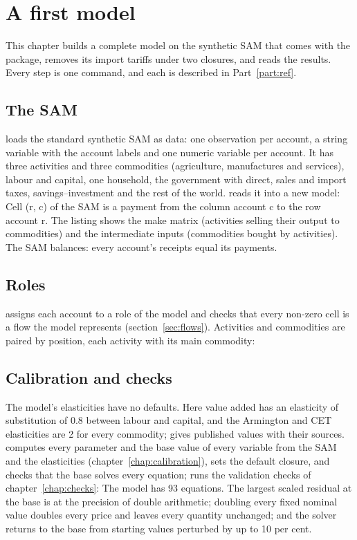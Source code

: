 \chapter{A first model}\label{chap:start}

This chapter builds a complete model on the synthetic SAM that comes with the
package, removes its import tariffs under two closures, and reads the results.
Every step is one command, and each is described in Part~\ref{part:ref}.

\section{The SAM}

 loads the standard synthetic SAM as data: one
observation per account, a string variable with the account labels and one
numeric variable per account. It has three activities and three commodities
(agriculture, manufactures and services), labour and capital, one household,
the government with direct, sales and import taxes, savings--investment and the
rest of the world.  reads it into a new model:
Cell (r, c) of the SAM is a payment from the column account c to the row
account r. The listing shows the make matrix (activities selling their output
to commodities) and the intermediate inputs (commodities bought by
activities). The SAM balances: every account's receipts equal its payments.

\section{Roles}

 assigns each account to a role of the model and checks that
every non-zero cell is a flow the model represents
(section~\ref{sec:flows}). Activities and commodities are paired by position,
each activity with its main commodity:

\section{Calibration and checks}

The model's elasticities have no defaults. Here value added has an elasticity
of substitution of 0.8 between labour and capital, and the Armington and CET
elasticities are 2 for every commodity;  gives
published values with their sources.  computes every
parameter and the base value of every variable from the SAM and the
elasticities (chapter~\ref{chap:calibration}), sets the default closure, and
checks that the base solves every equation;  runs the
validation checks of chapter~\ref{chap:checks}:
The model has 93 equations. The largest scaled residual at the base is at the
precision of double arithmetic; doubling every fixed nominal value doubles
every price and leaves every quantity unchanged; and the solver returns to the
base from starting values perturbed by up to 10 per cent.

